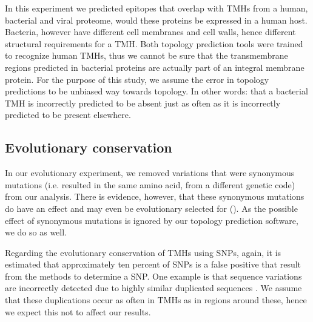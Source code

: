 In this experiment we predicted epitopes that overlap with 
TMHs from a human, bacterial and viral proteome,
would these proteins be expressed in a human host.
Bacteria, however have different cell membranes and cell walls, 
hence different structural requirements for a TMH.
Both topology prediction tools were trained to recognize
human TMHs, thus we cannot be sure that
the transmembrane regions predicted in bacterial proteins
are actually part of an integral membrane protein.
For the purpose of this study, we assume the 
error in topology predictions to be unbiased way towards topology.
In other words: that a bacterial TMH is incorrectly
predicted to be absent just as often as it is incorrectly
predicted to be present elsewhere.

\subsection{Evolutionary conservation}


In our evolutionary experiment, 
we removed variations that were synonymous mutations (i.e.
resulted in the same amino acid, from a different genetic code) 
from our analysis.
There is evidence, however, that these synonymous mutations
do have an effect and may even be evolutionary selected 
for (\cite{hunt2009silent}).
As the possible effect of synonymous mutations is ignored by our
topology prediction software, we do so as well.


Regarding the evolutionary conservation of TMHs using SNPs,
again, it is estimated that approximately ten percent
of SNPs is a false positive that result from the methods to determine
a SNP. One example is that sequence variations are incorrectly
detected due to highly similar duplicated sequences \cite{musumeci2010single}.
We assume that these duplications occur as often in TMHs as in
regions around these, hence we expect this not to affect our results.


